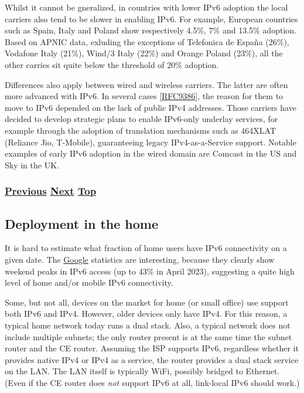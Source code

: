 \documentclass[
]{article}
\begin{document}
Whilst it cannot be gneralized, in countries with lower IPv6 adoption
the local carriers also tend to be slower in enabling IPv6. For example,
European countries such as Spain, Italy and Poland show respectively
4.5\%, 7\% and 13.5\% adoption. Based on APNIC data, exluding the
exceptions of Telefonica de España (26\%), Vodafone Italy (21\%), Wind/3
Italy (22\%) and Orange Poland (23\%), all the other carries sit quite
below the threshold of 20\% adoption.

Differences also apply between wired and wireless carriers. The latter
are often more advanced with IPv6. In several cases
{[}\href{https://www.rfc-editor.org/info/rfc9386}{RFC9386}{]}, the
reason for them to move to IPv6 depended on the lack of public IPv4
addresses. Those carriers have decided to develop strategic plans to
enable IPv6-only underlay services, for example through the adoption of
translation mechanisms such as 464XLAT (Reliance Jio, T-Mobile),
guaranteeing legacy IPv4-as-a-Service support. Notable examples of early
IPv6 adoption in the wired domain are Comcast in the US and Sky in the
UK.

\subsubsection{\texorpdfstring{\hyperref[status]{Previous}
\hyperref[deployment-in-the-home]{Next}
\hyperref[deployment-status]{Top}}{Previous Next Top}}\label{previous-next-top-28}

\pagebreak

\subsection{Deployment in the home}\label{deployment-in-the-home}

It is hard to estimate what fraction of home users have IPv6
connectivity on a given date. The
\href{https://www.google.com/intl/en/ipv6/statistics.html}{Google}
statistics are interesting, because they clearly show weekend peaks in
IPv6 access (up to 43\% in April 2023), suggesting a quite high level of
home and/or mobile IPv6 connectivity.

Some, but not all, devices on the market for home (or small office) use
support both IPv6 and IPv4. However, older devices only have IPv4. For
this reason, a typical home network today runs a dual stack. Also, a
typical network does not include multiple subnets; the only router
present is at the same time the subnet router and the CE router.
Assuming the ISP supports IPv6, regardless whether it provides native
IPv4 or IPv4 as a service, the router provides a dual stack service on
the LAN. The LAN itself is typically WiFi, possibly bridged to Ethernet.
(Even if the CE router does \emph{not} support IPv6 at all, link-local
IPv6 should work.)
\end{document}

